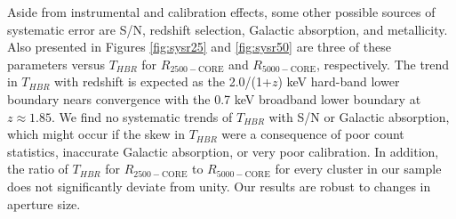 Aside from instrumental and calibration effects, some other possible
sources of systematic error are S/N, redshift selection, Galactic
absorption, and metallicity. Also presented in Figures
\ref{fig:sysr25} and \ref{fig:sysr50} are three of these parameters
versus $T_{HBR}$ for $R_{2500-\mathrm{CORE}}$ and
$R_{5000-\mathrm{CORE}}$, respectively. The trend in $T_{HBR}$ with
redshift is expected as the 2.0/(1+$z$) keV hard-band lower boundary
nears convergence with the 0.7 keV broadband lower boundary at $z
\approx 1.85$. We find no systematic trends of $T_{HBR}$ with S/N or
Galactic absorption, which might occur if the skew in $T_{HBR}$ were a
consequence of poor count statistics, inaccurate Galactic absorption,
or very poor calibration. In addition, the ratio of $T_{HBR}$ for
$R_{2500-\mathrm{CORE}}$ to $R_{5000-\mathrm{CORE}}$ for every cluster
in our sample does not significantly deviate from unity. Our results
are robust to changes in aperture size.

